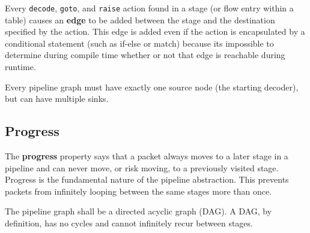 Every \texttt{decode}, \texttt{goto}, and \texttt{raise} action found in a stage (or flow entry within a table) causes an \textbf{edge} to be added between the stage and the destination specified by the action. This edge is added even if the action is encapsulated by a conditional statement (such as if-else or match) because its impossible to determine during compile time whether or not that edge is reachable during runtime. 

Every pipeline graph must have exactly one source node (the starting decoder), but can have multiple sinks.

\subsection{Progress} \label{progress_guide}

The \textbf{progress} property says that a packet always moves to a later stage in a pipeline and can never move, or risk moving, to a previously visited stage. Progress is the fundamental nature of the pipeline abstraction. This prevents packets from infinitely looping between the same stages more than once. 

The pipeline graph shall be a directed acyclic graph (DAG). A DAG, by definition, has no cycles and cannot infinitely recur between stages.

%
%

